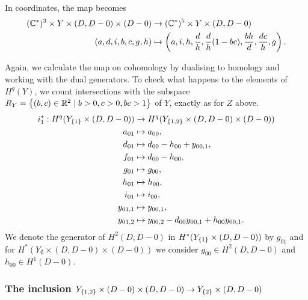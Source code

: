 In coordinates, the map becomes
\begin{align*}
  (\mathbb{C}^*)^3 \times Y \times (D,D-0)\times (D-0) &\to (\mathbb{C}^*)^5 \times Y
  \times (D,D-0) \\
  (a,d,i,b,c,g,h) &\mapsto \left(a,i,h,\frac{d}{h},
  \frac{d}{h}(1-bc), \frac{bh}{d},\frac{dc}{h},g\right).
\end{align*}

Again, we calculate the map on cohomology by dualising to homology
and working with the dual generators. To check what happens to the
elements of $H^q(Y)$, we count intersections with the subspace $R_Y =
\left\{ (b,c)\in \mathbb{R}^2 \mid b > 0, c > 0, bc > 1 \right\}$ of $Y$, exactly as for
$Z$ above.
\begin{align*}
  i_1^* : H^q(Y_{\left\{ 1 \right\}}\times (D,D-0)) &\to H^q(Y_{\left\{ 1,2 \right\}}\times
  (D,D-0)\times (D-0)) \\
  a_{01} &\mapsto a_{00}, \\
  d_{01} &\mapsto d_{00}-h_{00} + y_{00,1}, \\
  f_{01} &\mapsto d_{00} - h_{00}, \\
  g_{01} &\mapsto g_{00}, \\
  h_{01} &\mapsto h_{00}, \\
  i_{01} &\mapsto i_{00}, \\
  y_{01,1} &\mapsto y_{00,1}, \\
  y_{01,2} &\mapsto y_{00,2} - d_{00}y_{00,1} + h_{00}y_{00,1}.
\end{align*}
We denote the generator of $H^2(D,D-0)$ in
$H^*(Y_{\left\{ 1 \right\}}\times (D,D-0))$ by $g_{01}$ and for
$H^*(Y_{\emptyset} \times (D,D-0) \times (D-0))$ we consider $g_{00}\in
H^2(D,D-0)$ and $h_{00} \in H^1(D-0)$. 

\subsubsection{The inclusion $Y_{\left\{ 1,2 \right\}}\times (D-0)
\times (D,D-0) \to Y_{\left\{ 2 \right\}}\times (D,D-0)$}

